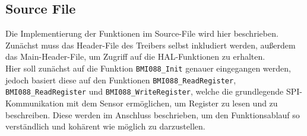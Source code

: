 \subsection{Source File}
\label{subsec:driver_source_file}
Die Implementierung der Funktionen im Source-File wird hier beschrieben.
Zunächst muss das Header-File des Treibers selbst inkludiert werden, außerdem das Main-Header-File, um Zugriff auf die HAL-Funktionen zu erhalten.
\\
Hier soll zunächst auf die Funktion \texttt{BMI088\_Init} genauer eingegangen werden, jedoch basiert diese auf den Funktionen \texttt{BMI088\_ReadRegister}, \texttt{BMI088\_ReadRegister} und \texttt{BMI088\_WriteRegister}, welche die grundlegende SPI-Kommunikation mit dem Sensor ermöglichen, um Register zu lesen und zu beschreiben.
Diese werden im Anschluss beschrieben, um den Funktionsablauf so verständlich und kohärent wie möglich zu darzustellen.
